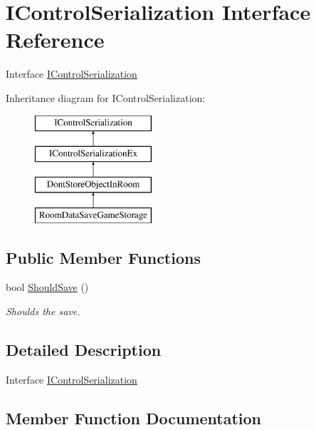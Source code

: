 \hypertarget{interface_i_control_serialization}{}\section{I\+Control\+Serialization Interface Reference}
\label{interface_i_control_serialization}


Interface \hyperlink{interface_i_control_serialization}{I\+Control\+Serialization}  


Inheritance diagram for I\+Control\+Serialization\+:\begin{figure}[H]
\begin{center}
\leavevmode
\includegraphics[height=4.000000cm]{interface_i_control_serialization}
\end{center}
\end{figure}
\subsection*{Public Member Functions}
\begin{DoxyCompactItemize}
\item 
bool \hyperlink{interface_i_control_serialization_af1036cb8968dc0508a7d1804a4c1feed}{Should\+Save} ()
\begin{DoxyCompactList}\small\item\em Shoulds the save. \end{DoxyCompactList}\end{DoxyCompactItemize}


\subsection{Detailed Description}
Interface \hyperlink{interface_i_control_serialization}{I\+Control\+Serialization} 



\subsection{Member Function Documentation}
\mbox{\label{interface_i_control_serialization_af1036cb8968dc0508a7d1804a4c1feed}} 
